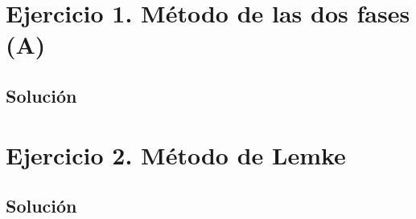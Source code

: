 \documentclass[11pt]{article}
\begin{document}
\section*{Ejercicio 1. Método de las dos fases (A)}


\subsection*{Solución}


\section*{Ejercicio 2. Método de Lemke}


\subsection*{Solución}

\end{document}
